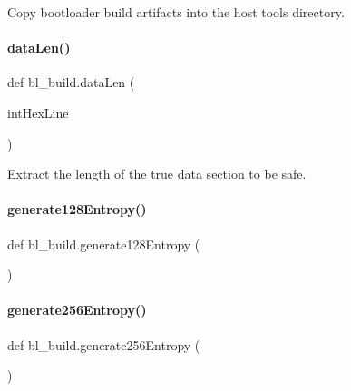 \begin{DoxyVerb}Copy bootloader build artifacts into the host tools directory.
\end{DoxyVerb}
 \mbox{\label{namespacebl__build_ab5b71cee689998b4be0b67b767416016}} 
\paragraph{\texorpdfstring{data\+Len()}{dataLen()}}
{\footnotesize\ttfamily def bl\+\_\+build.\+data\+Len (\begin{DoxyParamCaption}\item[{}]{int\+Hex\+Line }\end{DoxyParamCaption})}

\begin{DoxyVerb}Extract the length of the true data section to be safe.
\end{DoxyVerb}
 \mbox{\label{namespacebl__build_a8672b3c1dd7811f44d8ca6472ef674c2}} 
\paragraph{\texorpdfstring{generate128\+Entropy()}{generate128Entropy()}}
{\footnotesize\ttfamily def bl\+\_\+build.\+generate128\+Entropy (\begin{DoxyParamCaption}{ }\end{DoxyParamCaption})}

\mbox{\label{namespacebl__build_aa34856c463a31f6a99675774f4d6e861}} 
\paragraph{\texorpdfstring{generate256\+Entropy()}{generate256Entropy()}}
{\footnotesize\ttfamily def bl\+\_\+build.\+generate256\+Entropy (\begin{DoxyParamCaption}{ }\end{DoxyParamCaption})}


